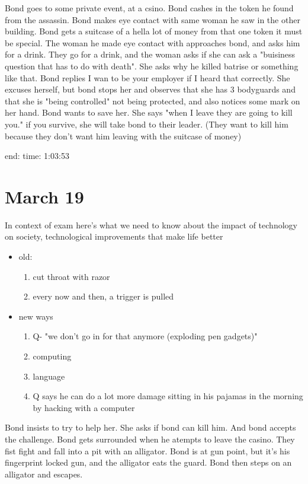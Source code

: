 \documentclass{article}
\begin{document}
    Bond goes to some private event, at a csino. Bond cashes in the token he found from the
    assassin. Bond makes eye contact with same woman he saw in the other building.
    Bond gets a suitcase of a hella lot of money from that one token
    it must be special. The woman he made eye contact with approaches bond,
    and asks him for a drink. They go for a drink, and the woman asks if she can ask
    a "buisiness question that has to do with death". She asks why he killed batrise or something like that.
    Bond replies I wan to be your employer if I heard that correctly. She excuses herself,
    but bond stops her and observes that she has 3 bodyguards and that she is "being controlled" not being protected,
    and also notices some mark on her hand.
    Bond wants to save her. She says "when I leave they are going to kill you."
    if you survive, she will take bond to their leader. (They want to kill him because they don't
    want him leaving with the suitcase of money)

    end: time: 1:03:53

    \section{March 19}
    In context of exam here's what we need to know about the impact of technology on society,
    technological improvements that make life better
    \begin{itemize}
      \item old:
        \begin{enumerate}
          \item cut throat with razor
          \item every now and then, a trigger is pulled
        \end{enumerate}
      \item new ways
        \begin{enumerate}
          \item Q- "we don't go in for that anymore (exploding pen gadgets)"
          \item computing
          \item language
          \item Q says he can do a lot more damage sitting in his pajamas in the morning by hacking with a computer
        \end{enumerate}
    \end{itemize}

    Bond insists to try to help her. She asks if bond can kill him. And bond accepts the challenge.
    Bond gets surrounded when he atempts to leave the casino. They fist fight and fall into a pit with an alligator.
    Bond is at gun point, but it's his fingerprint locked gun, and the alligator eats the guard.
    Bond then steps on an alligator and escapes.
\end{document}
